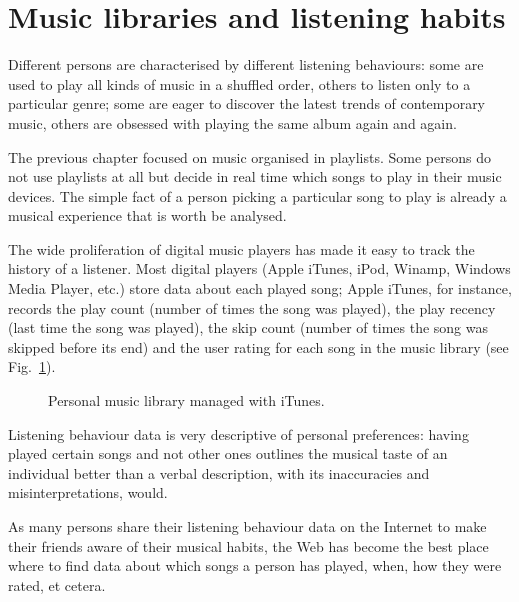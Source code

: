 \section{Music libraries and listening habits} %
\label{sec:listening_behaviour}


Different persons are characterised by different listening behaviours: some are used to play all kinds of music in a shuffled order, others to listen only to a particular genre; some are eager to discover the latest trends of contemporary music, others are obsessed with playing the same album again and again.

The previous chapter focused on music organised in playlists.
Some persons do not use playlists at all but decide in real time which songs to play in their music devices.
The simple fact of a person picking a particular song to play is already a musical experience that is worth be analysed.

The wide proliferation of digital music players has made it easy to track the history of a listener.
Most digital players (Apple iTunes, iPod, Winamp, Windows Media Player, etc.) store data about each played song; Apple iTunes, for instance, records the play count (number of times the song was played), the play recency (last time the song was played), the skip count (number of times the song was skipped before its end) and the user rating for each song in the music library (see Fig.~\ref{fig:itunes_claudio}).
%
\begin{figure}[bthp]
\centering \setlength{\abovecaptionskip}{3pt}
\caption{Personal music library managed with iTunes.}
\label{fig:itunes_claudio}
\end{figure}

Listening behaviour data is very descriptive of personal preferences: 
having played certain songs and not other ones outlines the musical taste of an individual better than a verbal description, with its inaccuracies and misinterpretations, would.

As many persons share their listening behaviour data on the Internet to make their friends aware of their musical habits, the Web has become the best place where to find data about which songs a person has played, when, how they were rated, et cetera.

